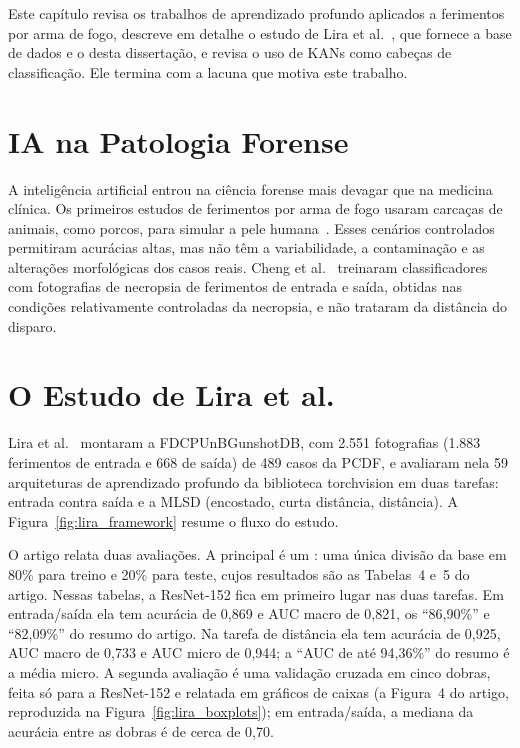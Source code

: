 \label{chap:related}

Este capítulo revisa os trabalhos de aprendizado profundo aplicados a ferimentos por arma de fogo, descreve em detalhe o estudo de Lira et al.~\cite{Lira2025deep}, que fornece a base de dados e o  desta dissertação, e revisa o uso de \glspl{KAN} como cabeças de classificação. Ele termina com a lacuna que motiva este trabalho.

\section{\texorpdfstring{\gls{IA}}{IA} na Patologia Forense}
\label{sec:ai_forensics}

A inteligência artificial entrou na ciência forense mais devagar que na medicina clínica. Os primeiros estudos de ferimentos por arma de fogo usaram carcaças de animais, como porcos, para simular a pele humana~\cite{oura2021deep}. Esses cenários controlados permitiram acurácias altas, mas não têm a variabilidade, a contaminação e as alterações morfológicas dos casos reais. Cheng et al.~\cite{cheng2024gunshot} treinaram classificadores com fotografias de necropsia de ferimentos de entrada e saída, obtidas nas condições relativamente controladas da necropsia, e não trataram da distância do disparo.

\section{O Estudo de Lira et al.}
\label{sec:2024_benchmark}

Lira et al.~\cite{Lira2025deep} montaram a FDCPUnBGunshotDB, com 2.551 fotografias (1.883 ferimentos de entrada e 668 de saída) de 489 casos da \gls{PCDF}, e avaliaram nela 59 arquiteturas de aprendizado profundo da biblioteca torchvision em duas tarefas: entrada contra saída e a \gls{MLSD} (encostado, curta distância, distância). A Figura~\ref{fig:lira_framework} resume o fluxo do estudo.


O artigo relata duas avaliações. A principal é um : uma única divisão da base em 80\% para treino e 20\% para teste, cujos resultados são as Tabelas~4 e~5 do artigo. Nessas tabelas, a ResNet-152 fica em primeiro lugar nas duas tarefas. Em entrada/saída ela tem acurácia de 0,869 e \gls{AUC} macro de 0,821, os ``86,90\%'' e ``82,09\%'' do resumo do artigo. Na tarefa de distância ela tem acurácia de 0,925, AUC macro de 0,733 e AUC micro de 0,944; a ``AUC de até 94,36\%'' do resumo é a média micro. A segunda avaliação é uma validação cruzada em cinco dobras, feita só para a ResNet-152 e relatada em gráficos de caixas (a Figura~4 do artigo, reproduzida na Figura~\ref{fig:lira_boxplots}); em entrada/saída, a mediana da acurácia entre as dobras é de cerca de 0,70.

